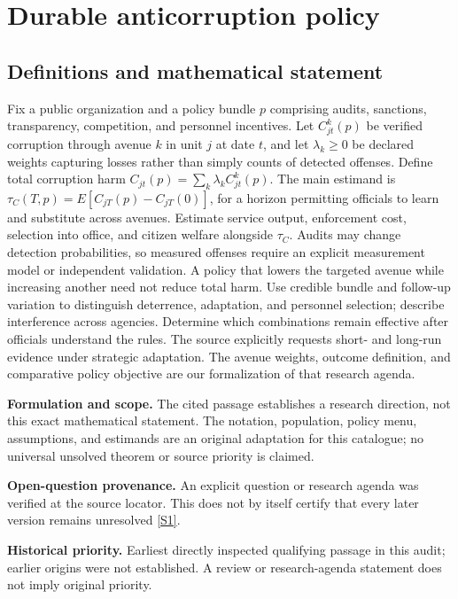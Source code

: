 \documentclass[11pt]{article}
\newcommand{\sref}[2]{\hyperlink{source:#1:#2}{[S#2]}}
\begin{document}
\section*{Durable anticorruption policy}\label{30007665}
\subsection{Definitions and mathematical statement}
Fix a public organization and a policy bundle \(p\) comprising audits, sanctions, transparency, competition, and personnel incentives. Let \(C^k_{jt}(p)\) be verified corruption through avenue \(k\) in unit \(j\) at date \(t\), and let \(\lambda_k\ge0\) be declared weights capturing losses rather than simply counts of detected offenses. Define total corruption harm \(C_{jt}(p)=\sum_k\lambda_kC^k_{jt}(p)\). The main estimand is \(\tau_C(T,p)=E[C_{jT}(p)-C_{jT}(0)]\), for a horizon permitting officials to learn and substitute across avenues. Estimate service output, enforcement cost, selection into office, and citizen welfare alongside \(\tau_C\). Audits may change detection probabilities, so measured offenses require an explicit measurement model or independent validation. A policy that lowers the targeted avenue while increasing another need not reduce total harm. Use credible bundle and follow-up variation to distinguish deterrence, adaptation, and personnel selection; describe interference across agencies. Determine which combinations remain effective after officials understand the rules. The source explicitly requests short- and long-run evidence under strategic adaptation. The avenue weights, outcome definition, and comparative policy objective are our formalization of that research agenda.

\par\textbf{Formulation and scope.} The cited passage establishes a research direction, not this exact mathematical statement. The notation, population, policy menu, assumptions, and estimands are an original adaptation for this catalogue; no universal unsolved theorem or source priority is claimed.

\par\textbf{Open-question provenance.} An explicit question or research agenda was verified at the source locator. This does not by itself certify that every later version remains unresolved \sref{30007665}{1}.

\par\textbf{Historical priority.} Earliest directly inspected qualifying passage in this audit; earlier origins were not established. A review or research-agenda statement does not imply original priority.
\end{document}

